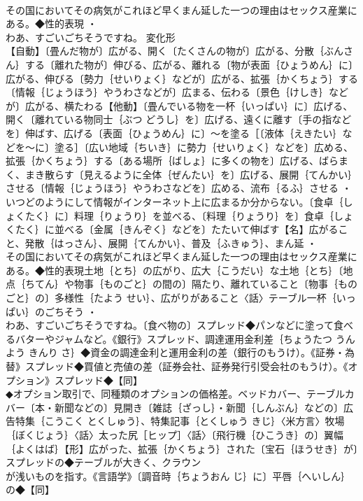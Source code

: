\documentclass[8pt]{extreport}
\begin{document}
\begin{CJK}{UTF8}{min}
\\	その国においてその病気がこれほど早くまん延した一つの理由はセックス産業にある。◆性的表現 ・
\\	わあ、すごいごちそうですね。	変化形 
\\	【自動】〔畳んだ物が〕広がる、開く〔たくさんの物が〕広がる、分散｛ぶんさん｝する〔離れた物が〕伸びる、広がる、離れる〔物が表面｛ひょうめん｝に〕広がる、伸びる〔勢力｛せいりょく｝などが〕広がる、拡張｛かくちょう｝する〔情報｛じょうほう｝やうわさなどが〕広まる、伝わる〔景色｛けしき｝などが〕広がる、横たわる【他動】〔畳んでいる物を一杯｛いっぱい｝に〕広げる、開く〔離れている物同士｛ぶつ どうし｝を〕広げる、遠くに離す〔手の指などを〕伸ばす、広げる〔表面｛ひょうめん｝に〕～を塗る［〔液体｛えきたい｝などを～に〕塗る］〔広い地域｛ちいき｝に勢力｛せいりょく｝などを〕広める、拡張｛かくちょう｝する〔ある場所｛ばしょ｝に多くの物を〕広げる、ばらまく、まき散らす〔見えるように全体｛ぜんたい｝を〕広げる、展開｛てんかい｝させる〔情報｛じょうほう｝やうわさなどを〕広める、流布｛るふ｝させる ・
\\	いつどのようにして情報がインターネット上に広まるか分からない。〔食卓｛しょくたく｝に〕料理｛りょうり｝を並べる、〔料理｛りょうり｝を〕食卓｛しょくたく｝に並べる〔金属｛きんぞく｝などを〕たたいて伸ばす【名】広がること、発散｛はっさん｝、展開｛てんかい｝、普及｛ふきゅう｝、まん延 ・
\\	その国においてその病気がこれほど早くまん延した一つの理由はセックス産業にある。◆性的表現土地｛とち｝の広がり、広大｛こうだい｝な土地｛とち｝〔地点｛ちてん｝や物事｛ものごと｝の間の〕隔たり、離れていること〔物事｛ものごと｝の〕多様性｛たよう せい｝、広がりがあること〈話〉テーブル一杯｛いっぱい｝のごちそう ・
\\	わあ、すごいごちそうですね。〔食べ物の〕スプレッド◆パンなどに塗って食べるバターやジャムなど。《銀行》スプレッド、調達運用金利差｛ちょうたつ うんよう きんり さ｝◆資金の調達金利と運用金利の差（銀行のもうけ）。《証券・為替》スプレッド◆買値と売値の差（証券会社、証券発行引受会社のもうけ）。《オプション》スプレッド◆【同】
\\	◆オプション取引で、同種類のオプションの価格差。ベッドカバー、テーブルカバー〔本・新聞などの〕見開き〔雑誌｛ざっし｝・新聞｛しんぶん｝などの〕広告特集｛こうこく とくしゅう｝、特集記事｛とくしゅう きじ｝〈米方言〉牧場｛ぼくじょう｝〈話〉太った尻［ヒップ］〈話〉〔飛行機｛ひこうき｝の〕翼幅｛よくはば｝【形】広がった、拡張｛かくちょう｝された〔宝石｛ほうせき｝が〕スプレッドの◆テーブルが大きく、クラウン
\\	が浅いものを指す。《言語学》〔調音時｛ちょうおん じ｝に〕平唇｛へいしん｝の◆【同】

\end{CJK}
\end{document}
